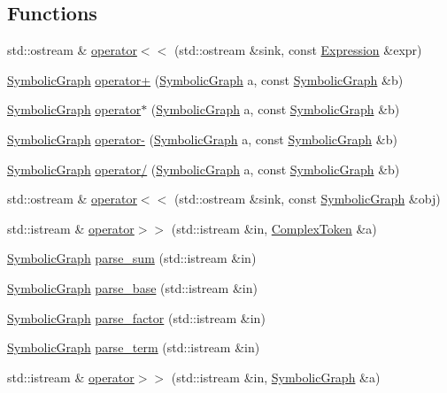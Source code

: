 \subsection*{Functions}
\begin{DoxyCompactItemize}
\item 
std\+::ostream \& \hyperlink{namespacesymcpp_a4665478217d9f0b9d2f3b815ae8d1bd4}{operator$<$$<$} (std\+::ostream \&sink, const \hyperlink{classsymcpp_1_1Expression}{Expression} \&expr)
\item 
\hyperlink{classsymcpp_1_1SymbolicGraph}{Symbolic\+Graph} \hyperlink{namespacesymcpp_a158d9eeff81ccfd1af9b8376ed2d05cc}{operator+} (\hyperlink{classsymcpp_1_1SymbolicGraph}{Symbolic\+Graph} a, const \hyperlink{classsymcpp_1_1SymbolicGraph}{Symbolic\+Graph} \&b)
\item 
\hyperlink{classsymcpp_1_1SymbolicGraph}{Symbolic\+Graph} \hyperlink{namespacesymcpp_a6d2e774f2cce2b171bea1416d772b833}{operator$\ast$} (\hyperlink{classsymcpp_1_1SymbolicGraph}{Symbolic\+Graph} a, const \hyperlink{classsymcpp_1_1SymbolicGraph}{Symbolic\+Graph} \&b)
\item 
\hyperlink{classsymcpp_1_1SymbolicGraph}{Symbolic\+Graph} \hyperlink{namespacesymcpp_ac2f5ad1173cb5fabb4b8d346878e5035}{operator-\/} (\hyperlink{classsymcpp_1_1SymbolicGraph}{Symbolic\+Graph} a, const \hyperlink{classsymcpp_1_1SymbolicGraph}{Symbolic\+Graph} \&b)
\item 
\hyperlink{classsymcpp_1_1SymbolicGraph}{Symbolic\+Graph} \hyperlink{namespacesymcpp_a4ec0ca24703ac5e096fceeb538d9e1a9}{operator/} (\hyperlink{classsymcpp_1_1SymbolicGraph}{Symbolic\+Graph} a, const \hyperlink{classsymcpp_1_1SymbolicGraph}{Symbolic\+Graph} \&b)
\item 
std\+::ostream \& \hyperlink{namespacesymcpp_a7ad455b0637c10962ac159edf36b2754}{operator$<$$<$} (std\+::ostream \&sink, const \hyperlink{classsymcpp_1_1SymbolicGraph}{Symbolic\+Graph} \&obj)
\item 
std\+::istream \& \hyperlink{namespacesymcpp_a9fe2d34ad3d273d051795b9a25d3c8ce}{operator$>$$>$} (std\+::istream \&in, \hyperlink{structsymcpp_1_1ComplexToken}{Complex\+Token} \&a)
\item 
\hyperlink{classsymcpp_1_1SymbolicGraph}{Symbolic\+Graph} \hyperlink{namespacesymcpp_a8fbf78e8fe2706165843d5716ff9025f}{parse\+\_\+sum} (std\+::istream \&in)
\item 
\hyperlink{classsymcpp_1_1SymbolicGraph}{Symbolic\+Graph} \hyperlink{namespacesymcpp_ac1190508010160ccc9081fd72ec62813}{parse\+\_\+base} (std\+::istream \&in)
\item 
\hyperlink{classsymcpp_1_1SymbolicGraph}{Symbolic\+Graph} \hyperlink{namespacesymcpp_aa72aeab474894e16fb524965bd1a2d82}{parse\+\_\+factor} (std\+::istream \&in)
\item 
\hyperlink{classsymcpp_1_1SymbolicGraph}{Symbolic\+Graph} \hyperlink{namespacesymcpp_ab5470ea5b8d3a87476a1cbda0c3251d5}{parse\+\_\+term} (std\+::istream \&in)
\item 
std\+::istream \& \hyperlink{namespacesymcpp_a6223fff1711cd0a60f4346e55c602da8}{operator$>$$>$} (std\+::istream \&in, \hyperlink{classsymcpp_1_1SymbolicGraph}{Symbolic\+Graph} \&a)
\end{DoxyCompactItemize}



